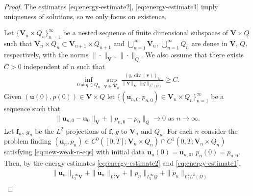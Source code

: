 \documentclass{amsart}
\newcommand{\algn}[1]{\begin{align} #1 \end{align}}
\newcommand{\LRp}[1]{\left( #1 \right)}
\newcommand{\dive}{\operatorname{div}}
\begin{document}
\begin{proof}
The estimates \eqref{eq:energy-estimate2}, \eqref{eq:energy-estimate1} imply uniqueness of solutions, so we only focus on existence.

Let $\{ \boldsymbol{V}_n \times Q_n \}_{n=1}^{\infty}$ be a nested sequence of finite dimensional subspaces of $\boldsymbol{V} \times Q$ such that $\boldsymbol{V}_{n} \times Q_{n} \subset \boldsymbol{V}_{n+1} \times Q_{n+1}$ and $\bigcup_{n=1}^{\infty} \boldsymbol{V}_n$, $\bigcup_{n=1}^{\infty} Q_n$ are dense in $\boldsymbol{V}$, $Q$, respectively, with the norms $\|\cdot\|_{\boldsymbol{V}}$, $\|\cdot \|_Q$. We also assume that there exists $C>0$ independent of $n$ such that 
%
\algn{
	\label{eq:discrete-inf-sup}
	\inf_{0\not = q \in Q_n} \sup_{\boldsymbol{v}\in \boldsymbol{V}_n} \frac{ ( q, \dive (\boldsymbol{v}))_{\Omega}}{\|\boldsymbol{v}\|_{\boldsymbol{V}}\|q\|_{L^2(\Omega)}} \ge C .
}
%
Given $\LRp{\boldsymbol{u}(0), p(0)} \in \boldsymbol{V} \times Q$ let $\{ \LRp{\boldsymbol{u}_{n, 0}, p_{n, 0}} \in \boldsymbol{V}_n \times Q_n \}_{n=1}^{\infty}$ be a sequence such that
%
\algn{
	\nonumber \|\boldsymbol{u}_{n, 0} - \boldsymbol{u}_0\|_{\boldsymbol{V}} + \|p_{n, 0} - p_0\|_{Q} \to 0 \text{ as }  n \to \infty. 
}
%
Let $\boldsymbol{f}_n$, $g_n$ be the $L^2$ projections of $\boldsymbol{f}$, $g$ to $\boldsymbol{V}_n$ and $Q_n$. For each $n$ consider the problem finding $\LRp{\boldsymbol{u}_n, p_n} \in C^0 \LRp{[0, T]; \boldsymbol{V}_n \times Q_n} \cap C^1 \LRp{0, T; \boldsymbol{V}_n \times Q_n}$ satisfying \eqref{eq:new-weak-n-eqs} 
%
with initial data $\boldsymbol{u}_n(0) = \boldsymbol{u}_{n, 0}$, $p_n (0) = p_{n, 0}$. 
Then, by the energy estimates \eqref{eq:energy-estimate2} and \eqref{eq:energy-estimate1}, 
%
\algn{
	\nonumber &\|\boldsymbol{u}_n\|_{L_t^{\infty} \boldsymbol{V}} + \|\dot{\boldsymbol{u}}_n\|_{L_t^{2} \boldsymbol{V}} + \|p_n\|_{L_t^{\infty} Q} + \|\dot{p}_n\|_{L_t^{2} L^2(\Omega)} \\
}
\end{proof}
\end{document}
